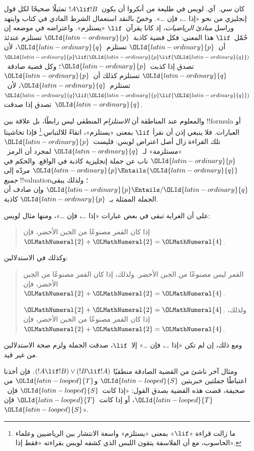 \documentclass[../../../include/open-logic-section]{subfiles}
\begin{document}


كان سي.~آي. لويس في طليعة من أنكروا أن يكون~$!A \lif !B$ تمثيلًا
صحيحًا لكل قول إنجليزي من نحو «إذا \dots، فإن \dots». وخصّ بالنقد
استعمال الشرط المادي في كتاب وايتهد وراسل \emph{مبادئ الرياضيات}، إذ
كانا يقرآن~$\lif$ «يستلزم». واعتراضه في موضعه إن حُمّل~$\lif$ هذا
المعنى: فكل قضية كاذبة~${\OLId{latin-ordinary}{p}}$ تستلزم عندئذ أن~${\OLId{latin-ordinary}{p}}$ تستلزم~${\OLId{latin-ordinary}{q}}$، لأن
${\OLId{latin-ordinary}{p}} \lif ({\OLId{latin-ordinary}{p}} \lif {\OLId{latin-ordinary}{q}})$ تصدق إذا كذبت~${\OLId{latin-ordinary}{p}}$؛ وكل قضية صادقة~${\OLId{latin-ordinary}{q}}$ تستلزم
كذلك أن~${\OLId{latin-ordinary}{p}}$ تستلزم~${\OLId{latin-ordinary}{q}}$، لأن~${\OLId{latin-ordinary}{q}} \lif ({\OLId{latin-ordinary}{p}} \lif {\OLId{latin-ordinary}{q}})$ تصدق إذا صدقت~${\OLId{latin-ordinary}{q}}$.

والمعلوم عند المناطقة أن \emph{الاستلزام} المنطقي ليس رابطًا، بل علاقة
بين !!{formula} أو العبارات. فلا ينبغي إذن أن نقرأ
$\lif$ بمعنى «يستلزم»، اتقاءً للالتباس.\footnote{ما زالت قراءة
  «$\lif$» بمعنى «يستلزم» واسعة الانتشار بين الرياضيين وعلماء الحاسوب،
  مع أن الفلاسفة يتقون اللبس الذي كشفه لويس بقراءته «فقط إذا».} فإذا
تحاشينا تلك القراءة زال أصل اعتراض لويس: فليست~${\OLId{latin-ordinary}{p}}$ «مستلزمة» لـ~${\OLId{latin-ordinary}{q}}$
لمجرد أن الرمز~${\OLId{latin-ordinary}{p}}$ ناب عن جملة إنجليزية كاذبة في الواقع. والحكم في
${\OLId{latin-ordinary}{p}} \Entails {\OLId{latin-ordinary}{q}}$ مردّه إلى \emph{جميع} !!{valuation}؛ ولذلك يبقى
${\OLId{latin-ordinary}{p}} \Entails/ {\OLId{latin-ordinary}{q}}$ وإن صادف أن الجملة الممثلة بـ~${\OLId{latin-ordinary}{p}}$ كاذبة.

على أن الغرابة تبقى في بعض عبارات «إذا \dots، فإن \dots»، ومنها مثال
لويس:
\begin{quote}
إذا كان القمر مصنوعًا من الجبن الأخضر، فإن~${\OLMathNumeral{2}}+{\OLMathNumeral{2}}={\OLMathNumeral{4}}$.
\end{quote}
وكذلك في الاستدلالين:
\begin{quote}
  القمر ليس مصنوعًا من الجبن الأخضر. ولذلك، إذا كان القمر مصنوعًا
  من الجبن الأخضر، فإن~${\OLMathNumeral{2}}+{\OLMathNumeral{2}}={\OLMathNumeral{4}}$.

  ${\OLMathNumeral{2}}+{\OLMathNumeral{2}} = {\OLMathNumeral{4}}$. ولذلك، إذا كان القمر مصنوعًا
  من الجبن الأخضر، فإن~${\OLMathNumeral{2}}+{\OLMathNumeral{2}}={\OLMathNumeral{4}}$.
\end{quote}
ومع ذلك، إن لم تكن «إذا \dots، فإن \dots» إلا~$\lif$، صدقت الجملة
ولزم صحة الاستدلالين من غير قيد.

ومثال آخر ناشئ من القضية الصادقة منطقيًا
$(!A \lif !B) \lor (!B \lif !A)$. فإن أخذنا اعتباطًا جملتين خبريتين
${\OLId{latin-looped}{S}}$ و${\OLId{latin-looped}{T}}$ من صحيفة، قضت هذه القضية بصدق القول: «إذا كانت~${\OLId{latin-looped}{S}}$ فإن~${\OLId{latin-looped}{T}}$،
أو إذا كانت~${\OLId{latin-looped}{T}}$ فإن~${\OLId{latin-looped}{S}}$».
\end{document}
